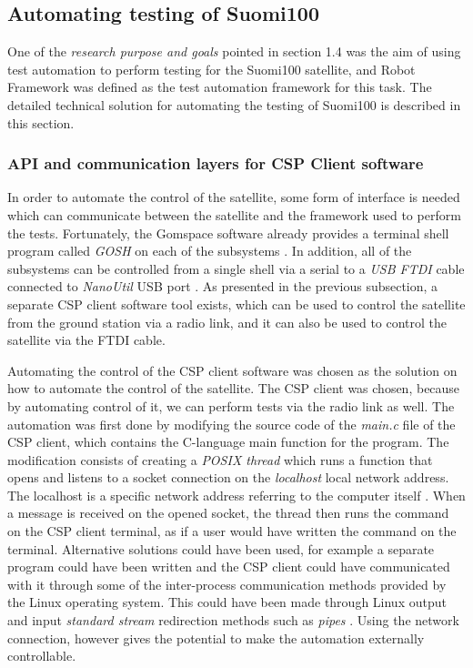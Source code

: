 \documentclass[english,12pt,a4paper,pdftex,elec,utf8]{aaltothesis}
\begin{document}
\subsection{Automating testing of Suomi100}
One of the \textit{research purpose and goals} pointed in section 1.4 was the aim of using test automation to perform testing for the Suomi100 satellite, and Robot Framework was defined as the test automation framework for this task. The detailed technical solution for automating the testing of Suomi100 is described in this section.
\subsubsection{API and communication layers for CSP Client software}
In order to automate the control of the satellite, some form of interface is needed which can
communicate between the satellite and the framework used to perform the tests.
Fortunately, the Gomspace software already provides a terminal shell program called \textit{GOSH} on each of the subsystems \cite{nanomindds}. In addition, all of the subsystems can be controlled from a single shell via a serial to a \textit{USB FTDI} cable connected to \textit{NanoUtil} USB port \cite{avrtoolchain}. As presented in the previous subsection,  a separate CSP client
software tool exists, which can be used to control the satellite from the 
ground station via a radio link, and it can also be used to control the satellite via the FTDI cable.\par
Automating the control of the CSP client software was chosen as the solution on how to 
automate the control of the satellite. The CSP client was chosen, because by automating
control of it, we can perform tests via the radio link as well. The automation was first done by
modifying the source code of the \textit{main.c} file of the CSP client, which contains the C-language main function for the program. The modification consists of creating a \textit{POSIX thread} which runs a function that opens and listens to a socket connection on the \textit{localhost} local network address. The localhost is a specific network address referring to the computer itself \cite{linuxproginterface}. When a message is received on the opened socket, the thread then runs the command on the CSP client terminal, as if a user would have written the command on the terminal. Alternative solutions could have been used, for example a separate program could have been written and the CSP client could have communicated with it through some of the inter-process communication methods provided by the Linux operating system. This could have been made through Linux output and input \textit{standard stream} redirection methods such as \textit{pipes} \cite{linuxproginterface}. Using the network connection, however gives the potential to make the automation externally controllable. \par 
\end{document}
